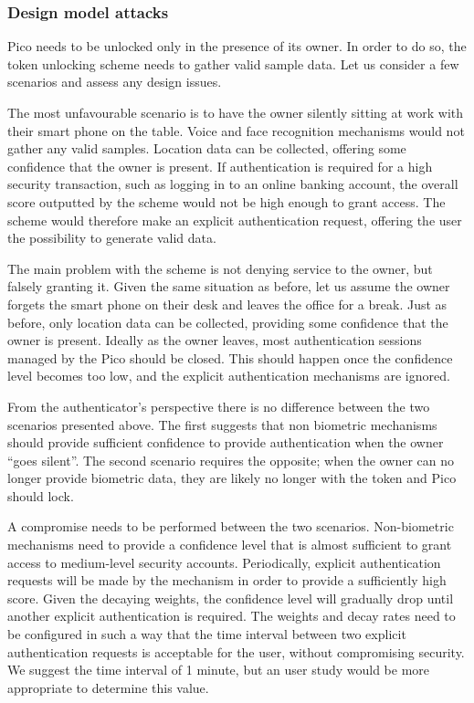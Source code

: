 \subsubsection*{Design model attacks}
\label{secdesignattacks}
Pico needs to be unlocked only in the presence of its owner. In order to do so, the token unlocking scheme needs to gather valid sample data. Let us consider a few scenarios and assess any design issues.
 
The most unfavourable scenario is to have the owner silently sitting at work with their smart phone on the table. Voice and face recognition mechanisms would not gather any valid samples. Location data can be collected, offering some confidence that the owner is present. If authentication is required for a high security transaction, such as logging in to an online banking account, the overall score outputted by the scheme would not be high enough to grant access. The scheme would therefore make an explicit authentication request, offering the user the possibility to generate valid data.

The main problem with the scheme is not denying service to the owner, but falsely granting it. Given the same situation as before, let us assume the owner forgets the smart phone on their desk and leaves the office for a break. Just as before, only location data can be collected, providing some confidence that the owner is present. Ideally as the owner leaves, most authentication sessions managed by the Pico should be closed. This should happen once the confidence level becomes too low, and the explicit authentication mechanisms are ignored.

From the authenticator's perspective there is no difference between the two scenarios presented above. The first suggests that non biometric mechanisms should provide sufficient confidence to provide authentication when the owner ``goes silent''. The second scenario requires the opposite; when the owner can no longer provide biometric data, they are likely no longer with the token and Pico should lock. 

A compromise needs to be performed between the two scenarios. Non-biometric mechanisms need to provide a confidence level that is almost sufficient to grant access to medium-level security accounts. Periodically, explicit authentication requests will be made by the mechanism in order to provide a sufficiently high score. Given the decaying weights, the confidence level will gradually drop until another explicit authentication is required. The weights and decay rates need to be configured in such a way that the time interval between two explicit authentication requests is acceptable for the user, without compromising security. We suggest the time interval of 1 minute, but an user study would be more appropriate to determine this value.

